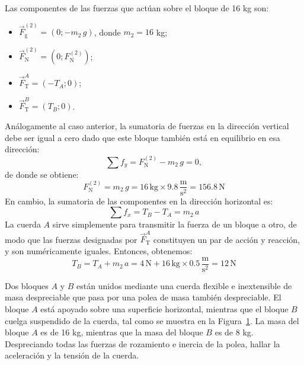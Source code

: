 \documentclass[addpoints]{exam}
\begin{document}
\begin{questions}
\begin{solution}
        Las componentes de las fuerzas que actúan sobre el bloque de 16 kg son:
        \begin{itemize}
            \item $\vec{F}_\text{g}^{(2)} = \left(0; - m_2 \, g\right)$, donde $m_2 = 16$ kg;
            \item $\vec{F}_{\text{N}}^{(2)} = \left(0;F_{\text{N}}^{(2)}\right)$;
            \item $\vec{F}_\text{T}^A = \left(-T_A; 0\right)$;
            \item $\vec{F}_\text{T}^B = \left(T_B; 0\right)$.
        \end{itemize}
        Análogamente al caso anterior, la sumatoria de fuerzas en la dirección vertical debe ser igual a cero dado que este bloque también está en equilibrio en esa dirección: $$\sum f_y = F_{\text{N}}^{(2)} - m_2 \, g = 0,$$ de donde se obtiene: $$F_{\text{N}}^{(2)} = m_2 \, g = 16 \, \text{kg} \times 9.8 \, \frac{\text{m}}{\text{s}^2} = 156.8 \, \text{N}$$ En cambio, la sumatoria de las componentes en la dirección horizontal es: $$ \sum f_x = T_B - T_A = m_2 \, a$$ La cuerda $A$ sirve simplemente para transmitir la fuerza de un bloque a otro, de modo que las fuerzas designadas por $\vec{F}_\text{T}^A$ constituyen un par de acción y reacción, y son numéricamente iguales. Entonces, obtenemos: $$T_B = T_A + m_2 \, a = 4 \, \text{N} + 16 \, \text{kg} \times 0.5 \, \frac{\text{m}}{\text{s}^2} = 12 \, \text{N}$$
    \end{solution}

    \question Dos bloques $A$ y $B$ están unidos mediante una cuerda flexible e inextensible de masa despreciable que pasa por una polea de masa también despreciable. El bloque $A$ está apoyado sobre una superficie horizontal, mientras que el bloque $B$ cuelga suspendido de la cuerda, tal como se muestra en la Figura~\ref{fig:vinculados2}. La masa del bloque $A$ es de 16 kg, mientras que la masa del bloque $B$ es de 8 kg. Despreciando todas las fuerzas de rozamiento e inercia de la polea, hallar la aceleración y la tensión de la cuerda.

    \begin{figure}[h]
        \centering
        \caption{ }
        \label{fig:vinculados2}
    \end{figure}


\end{questions}
\end{document}

